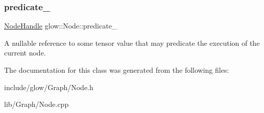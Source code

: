 \subsubsection{\texorpdfstring{predicate\+\_\+}{predicate\_}}
{\footnotesize\ttfamily \hyperlink{structglow_1_1_node_handle}{Node\+Handle} glow\+::\+Node\+::predicate\+\_\+\hspace{0.3cm}{\ttfamily [protected]}}

A nullable reference to some tensor value that may predicate the execution of the current node. 

The documentation for this class was generated from the following files\+:\begin{DoxyCompactItemize}
\item 
include/glow/\+Graph/Node.\+h\item 
lib/\+Graph/Node.\+cpp\end{DoxyCompactItemize}
